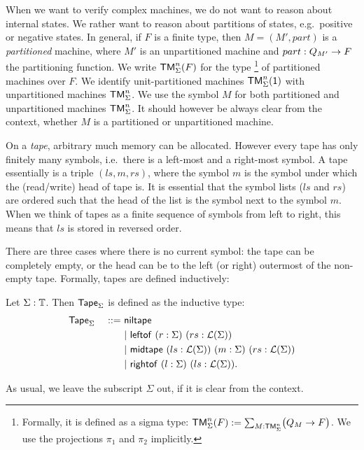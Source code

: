 When we want to verify complex machines, we do not want to reason about internal states.  We rather want to reason about partitions of states, e.g.\
positive or negative states.  In general, if $F$ is a finite type, then $M = (M', part)$ is a \emph{partitioned} machine, where $M'$ is an
unpartitioned machine and $part : Q_{M'} \rightarrow F$ the partitioning function.  We write $\mathsf{TM}_\Sigma^n(F)$ for the type%
\footnote{Formally, it is defined as a sigma type: $\mathsf{TM}_\Sigma^n(F) := \sum_{M:\mathsf{TM}_\Sigma^n}\bigl(Q_M \rightarrow F\bigr)$.  We use the projections
  $\pi_1$ and $\pi_2$ implicitly.}%
of partitioned machines over $F$.  We identify unit-partitioned machines $\mathsf{TM}_\Sigma^n(\mathsf{1})$ with unpartitioned machines $\mathsf{TM}_\Sigma^n$.  We use the
symbol $M$ for both partitioned and unpartitioned machines $\mathsf{TM}_\Sigma^n$.  It should however be always clear from the context, whether $M$ is a
partitioned or unpartitioned machine.

On a \emph{tape}, arbitrary much memory can be allocated.  However every tape has only finitely many symbols, i.e.\ there is a left-most and a
right-most symbol.  A tape essentially is a triple $(ls,m,rs)$, where the symbol $m$ is the symbol under which the (read/write) head of tape is.  It
is essential that the symbol lists ($ls$ and $rs$) are ordered such that the head of the list is the symbol next to the symbol $m$.  When we think of
tapes as a finite sequence of symbols from left to right, this means that $ls$ is stored in reversed order.

There are three cases where there is no current symbol: the tape can be completely empty, or the head can be to the left (or right) outermost of the
non-empty tape.  Formally, tapes are defined inductively:

\begin{definition}[Tape][tape]
  \label{def:tape}
  Let $\Sigma : \mathbb{T}$.  Then $\mathsf{Tape}_\Sigma$ is defined as the inductive type:
  \begin{alignat*}{2}
    & \mathsf{Tape}_\Sigma &~::=~& \mathsf{niltape} \\
    &&& |~ \mathsf{leftof}  ~ (r:\Sigma) ~ (rs:\mathcal{L}(\Sigma)) \\
    &&& |~ \mathsf{midtape} ~ (ls:\mathcal{L}(\Sigma)) ~ (m:\Sigma) ~ (rs:\mathcal{L}(\Sigma)) \\
    &&& |~ \mathsf{rightof} ~ (l:\Sigma) ~ (ls:\mathcal{L}(\Sigma)).
  \end{alignat*}
\end{definition}

As usual, we leave the subscript $\Sigma$ out, if it is clear from the context.


